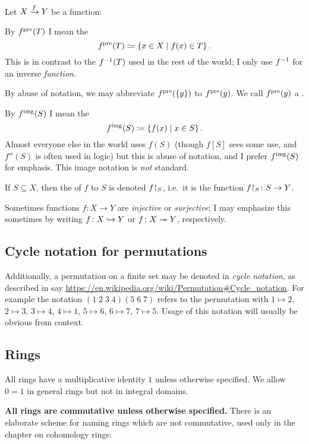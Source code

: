 Let $X \xrightarrow{f} Y$ be a function:
\begin{itemize}
\ii By $f^{\text{pre}}(T)$ I mean the 
\[ f^{\text{pre}}(T) \coloneqq \left\{ x \in X \mid f(x) \in T \right\}.  \]
This is in contrast to the $f^{-1}(T)$ used in the rest of the world;
I only use $f^{-1}$ for an inverse \emph{function}.

By abuse of notation, we may abbreviate $f^{\text{pre}}(\{y\})$ to $f^{\text{pre}}(y)$.
We call $f^{\text{pre}}(y)$ a .

\ii By $f^{\text{img}}(S)$ I mean the 
\[ f^{\text{img}}(S) \coloneqq \left\{ f(x) \mid x \in S \right\}. \]
Almost everyone else in the world uses $f(S)$
(though $f[S]$ sees some use, and $f''(S)$ is often used in logic)
but this is abuse of notation,
and I prefer $f^{\text{img}}(S)$ for emphasis.
This image notation is \emph{not} standard.

\ii If $S \subseteq X$, then the  of $f$ to $S$
is denoted $f \restrict{S}$,
i.e.\ it is the function $f \restrict{S} \colon S \to Y$.

\ii Sometimes functions $f \colon X \to Y$
are \emph{injective} or \emph{surjective};
I may emphasize this sometimes by writing
$f \colon X \hookrightarrow Y$ or $f \colon X \twoheadrightarrow Y$, respectively.
\end{itemize}

\subsection{Cycle notation for permutations}
\label{subsec:cycle_notation}

Additionally, a permutation on a finite set may be denoted
in \emph{cycle notation},
as described in say \url{https://en.wikipedia.org/wiki/Permutation#Cycle_notation}.
For example the notation $(1 \; 2 \; 3 \; 4)(5 \; 6 \; 7)$
refers to the permutation with
$1 \mapsto 2$, $2 \mapsto 3$, $3 \mapsto 4$, $4 \mapsto 1$,
$5 \mapsto 6$, $6 \mapsto 7$, $7 \mapsto 5$.
Usage of this notation will usually be obvious from context.

\subsection{Rings}
All rings have a multiplicative identity $1$ unless otherwise specified.
We allow $0=1$ in general rings but not in integral domains.

\textbf{All rings are commutative unless otherwise specified.}
There is an elaborate scheme for naming rings which are not commutative,
used only in the chapter on cohomology rings:

